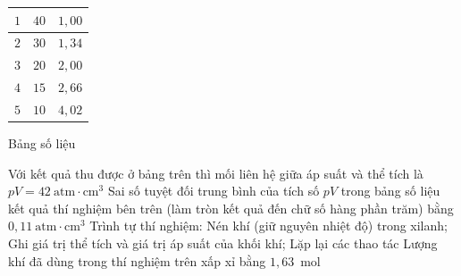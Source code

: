 \begin{ex}
\begin{center}
\begin{minipage}[c]{0.46\linewidth}
{\begin{tabular}{|c|c|c|}
					\hline
					$1$ & $40$ & $1{,}00$\\
					\hline
					$2$ & $30$ & $1{,}34$\\
					\hline
					$3$ & $20$ & $2{,}00$\\
					\hline
					$4$ & $15$ & $2{,}66$\\
					\hline
					$5$ & $10$ & $4{,}02$\\
					\hline
				\end{tabular}\par\smallskip
				Bảng số liệu}
			\end{minipage}
		\end{center}
		\choiceTFt
		{Với kết quả thu được ở bảng trên thì mối liên hệ giữa áp suất và thể tích là $pV=42~\text{atm}\cdot\text{cm}^3$}
		{\True Sai số tuyệt đối trung bình của tích số $pV$ trong bảng số liệu kết quả thí nghiệm bên trên (làm tròn kết quả đến chữ số hàng phần trăm) bằng $0{,}11~\text{atm}\cdot\text{cm}^3$}
		{\True Trình tự thí nghiệm: Nén khí (giữ nguyên nhiệt độ) trong xilanh; Ghi giá trị thể tích và giá trị áp suất của khối khí; Lặp lại các thao tác}
		{Lượng khí đã dùng trong thí nghiệm trên xấp xỉ bằng $1{,}63$~mol}
	\end{ex}

